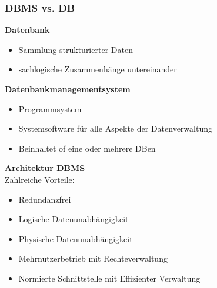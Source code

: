 \documentclass{scrreprt}
\begin{document}
\subsubsection{DBMS vs. DB}
\textbf{Datenbank}
\begin{itemize}
  \item Sammlung strukturierter Daten
  \item sachlogische Zusammenhänge untereinander
\end{itemize}
\textbf{Datenbankmanagementsystem}
\begin{itemize}
  \item Programmsystem
  \item Systemsoftware für alle Aspekte der Datenverwaltung
  \item Beinhaltet of eine oder mehrere DBen
\end{itemize}
\textbf{Architektur DBMS}
\\Zahlreiche Vorteile:
\begin{itemize}
  \item Redundanzfrei
  \item Logische Datenunabhängigkeit
  \item Physische Datenunabhängigkeit
  \item Mehrnutzerbetrieb mit Rechteverwaltung
  \item Normierte Schnittstelle mit Effizienter Verwaltung
\end{itemize}
\end{document}
